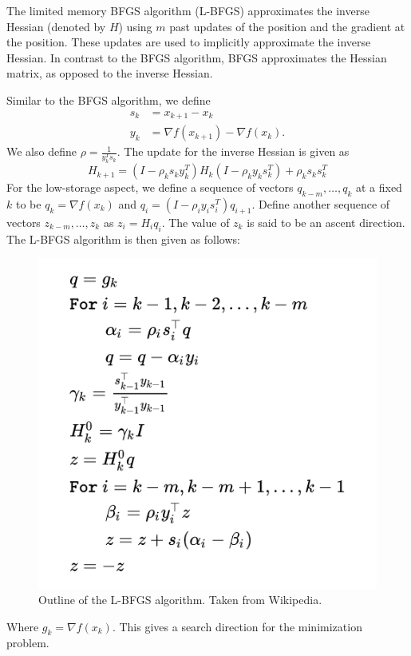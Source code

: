 
The limited memory BFGS algorithm (L-BFGS) approximates the inverse Hessian (denoted by $H$) using $m$ past updates of the position and the gradient at the position. These updates are used to implicitly approximate the inverse Hessian. In contrast to the BFGS algorithm, BFGS approximates the Hessian matrix, as opposed to the inverse Hessian.


Similar to the BFGS algorithm, we define
\begin{align*}
    s_k &= x_{k+1} - x_k\\
    y_k &= \nabla f(x_{k+1}) - \nabla f(x_k).
\end{align*}
We also define $\rho = \frac{1}{y_k^Ts_k}$. The update for the inverse Hessian is given as
\[H_{k+1} = (I - \rho_ks_ky_k^T)H_k(I - \rho_ky_ks_k^T) + \rho_ks_ks_k^T\]
For the low-storage aspect, we define a sequence of vectors $q_{k-m}, \dots, q_k$ at a fixed $k$ to be $q_k = \nabla f(x_k)$ and $q_i = (I - \rho_iy_is_i^T)q_{i+1}$. Define another sequence of vectors $z_{k-m},\dots, z_k$ as $z_i = H_iq_i$. The value of $z_k$ is said to be an ascent direction. The L-BFGS algorithm is then given as follows:
\begin{figure}[H]
    \includegraphics[scale = 1]{images/L-BFGS-Algorithm.png}
    \centering
    \caption{Outline of the L-BFGS algorithm. Taken from Wikipedia.}
\end{figure}
Where $g_k = \nabla f(x_k)$.
\newline
This gives a search direction for the minimization problem.